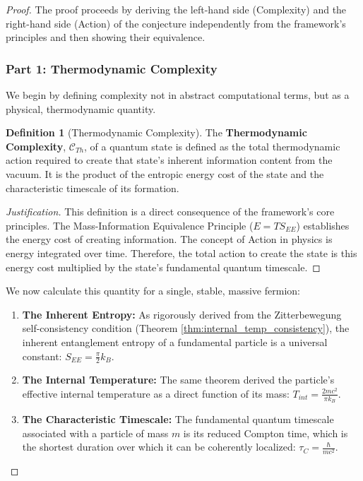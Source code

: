 \documentclass[11pt, letterpaper]{report}
\theoremstyle{plain} %
\theoremstyle{definition} %
\newtheorem{definition}{Definition}[chapter]
\theoremstyle{remark} %
\begin{document}
\begin{proof}
The proof proceeds by deriving the left-hand side (Complexity) and the right-hand side (Action) of the conjecture independently from the framework's principles and then showing their equivalence.

\subsubsection*{Part 1: Thermodynamic Complexity}

We begin by defining complexity not in abstract computational terms, but as a physical, thermodynamic quantity.

\begin{definition}[Thermodynamic Complexity]
The \textbf{Thermodynamic Complexity}, $\mathcal{C}_{Th}$, of a quantum state is defined as the total thermodynamic action required to create that state's inherent information content from the vacuum. It is the product of the entropic energy cost of the state and the characteristic timescale of its formation.
\end{definition}
\begin{proof}[Justification]
This definition is a direct consequence of the framework's core principles. The Mass-Information Equivalence Principle ($E = T S_{EE}$) establishes the energy cost of creating information. The concept of Action in physics is energy integrated over time. Therefore, the total action to create the state is this energy cost multiplied by the state's fundamental quantum timescale.
\end{proof}

We now calculate this quantity for a single, stable, massive fermion:
\begin{enumerate}
    \item \textbf{The Inherent Entropy:} As rigorously derived from the Zitterbewegung self-consistency condition (Theorem \ref{thm:internal_temp_consistency}), the inherent entanglement entropy of a fundamental particle is a universal constant: $S_{EE} = \frac{\pi}{2} k_B$.

    \item \textbf{The Internal Temperature:} The same theorem derived the particle's effective internal temperature as a direct function of its mass: $T_{int} = \frac{2mc^2}{\pi k_B}$.

    \item \textbf{The Characteristic Timescale:} The fundamental quantum timescale associated with a particle of mass $m$ is its reduced Compton time, which is the shortest duration over which it can be coherently localized: $\tau_C = \frac{\hbar}{mc^2}$.


\end{enumerate}
\end{proof}
\end{document}
